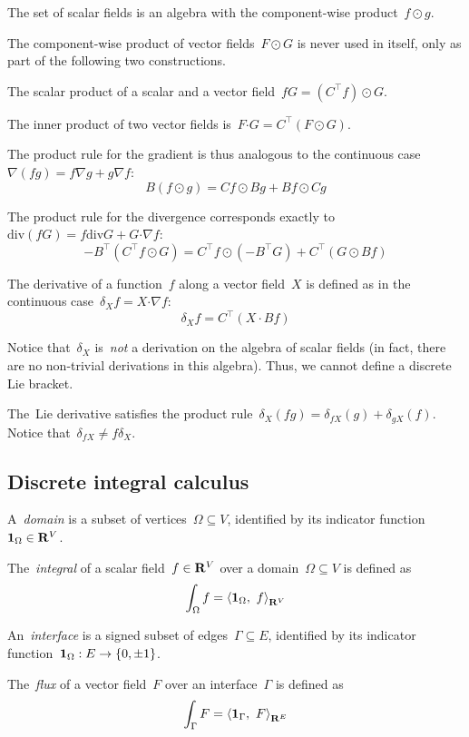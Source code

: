 The set of scalar fields is an algebra with the component-wise
product~$f\odot g$.

The component-wise product of vector fields~$F\odot G$ is never used in
itself, only as part of the following two constructions.

The scalar product of a scalar and a vector field~$fG=\left(C^\top f\right)\odot G$.

The inner product of two vector fields is~$F\boldsymbol{\cdot} G=C^\top\left(F\odot
G\right)$.

The product rule for the gradient is thus analogous to the
continuous case~$\nabla\left(fg\right)=f\nabla g+g\nabla f$:
\[
	B\left(f\odot g\right) = Cf\odot Bg+Bf\odot Cg
\]

The product rule for the divergence corresponds exactly
to~$\mathrm{div}\left(fG\right)=f\mathrm{div}G+G\boldsymbol{\cdot}\nabla f$:
\[
	-B^\top\left(C^\top f\odot G\right)
	=
	C^\top f\odot\left(-B^\top G\right)+C^\top\left(G\odot Bf\right)
\]

The derivative of a function~$f$ along a vector field~$X$ is defined as in
the continuous case~$\delta_X f = X\boldsymbol{\cdot}\nabla f$:
\[
	\delta_X f = C^\top \left(X\cdot Bf\right)
\]

Notice that~$\delta_X$ is~\emph{not} a derivation on the algebra of scalar
fields (in fact, there are no non-trivial derivations in this algebra).
Thus, we cannot define a discrete Lie bracket.

The~Lie derivative satisfies the product
rule~$\delta_X\left(fg\right)=\delta_{fX}\left(g\right)+\delta_{gX}\left(f\right)$.
Notice that~$\delta_{fX}\neq f\delta_{X}$.

\subsection{Discrete integral calculus}

A~\emph{domain} is a subset of vertices~$\Omega\subseteq V$, identified by
its indicator function~$\mathbf{1}_\Omega\in\mathbf{R}^V$.

The~\emph{integral} of a scalar field~$f\in\mathbf{R}^V$ over a
domain~$\Omega\subseteq V$ is defined as
\[
	\int_\Omega f = \left\langle\mathbf{1}_\Omega,\ f\right\rangle_{\mathbf{R}^V}
\]

An~\emph{interface} is a signed subset of edges~$\Gamma\subseteq E$,
identified by its indicator function~$\mathbf{1}_\Omega:E\to\{0,\pm 1\}$.

The~\emph{flux} of a vector field~$F$ over an interface~$\Gamma$ is defined
as
\[
	\int_\Gamma F = \left\langle\mathbf{1}_\Gamma,\ F\right\rangle_{\mathbf{R}^E}
\]

